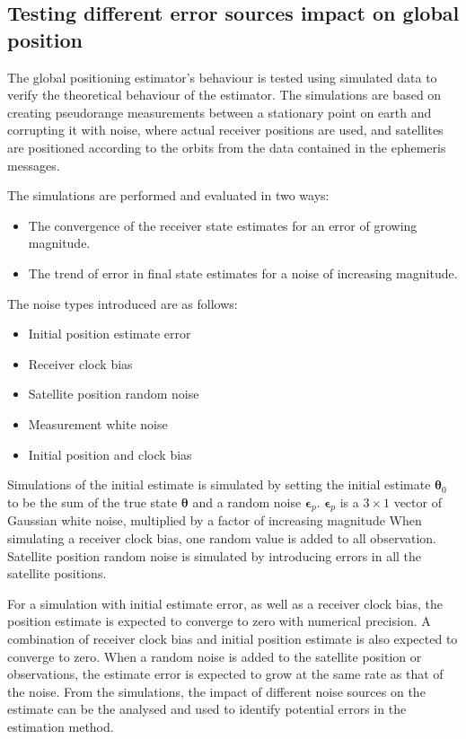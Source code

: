 \subsection{Testing different error sources impact on global position}\label{simNoiseConvergence}
The global positioning estimator's behaviour is tested using simulated data to verify the theoretical behaviour of the estimator. The simulations are based on creating pseudorange measurements between a stationary point on earth and corrupting it with noise, where actual receiver positions are used, and satellites are positioned according to the orbits from the data contained in the ephemeris messages. 
\par 
The simulations are performed and evaluated in two ways:
\begin{itemize}
\item The convergence of the receiver state estimates for an error of growing magnitude.
\item The trend of error in final state estimates for a noise of increasing magnitude.
\end{itemize} 
The noise types introduced are as follows:
\begin{itemize}
\item Initial position estimate error
\item Receiver clock bias
\item Satellite position random noise
\item Measurement white noise
\item Initial position and clock bias
\end{itemize}
Simulations of the initial estimate is simulated by setting the initial estimate ${\boldsymbol \theta}_0$ to be the sum of the true state ${\boldsymbol \theta}$ and a random noise ${\boldsymbol \epsilon}_p$. ${\boldsymbol \epsilon}_p$ is a $3\times1$ vector of Gaussian white noise, multiplied by a factor of increasing magnitude%
When simulating a receiver clock bias, one random value is added to all observation. Satellite position random noise is simulated by introducing errors in all the satellite positions. 
\par
For a simulation with initial estimate error, as well as a receiver clock bias, the position estimate is expected to converge to zero with numerical precision. A combination of receiver clock bias and initial position estimate is also expected to converge to zero. When a random noise is added to the satellite position or observations, the estimate error is expected to grow at the same rate as that of the noise. From the simulations, the impact of different noise sources on the estimate can be the analysed and used to identify potential errors in the estimation method. 

